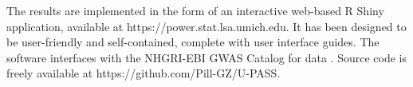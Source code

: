 
The results are implemented in the form of an interactive web-based R Shiny application, available at {https://power.stat.lsa.umich.edu}. 
It has been designed to be user-friendly and self-contained, complete with user interface guides. 
The software interfaces with the NHGRI-EBI GWAS Catalog for data .
Source code is freely available at {https://github.com/Pill-GZ/U-PASS}.
